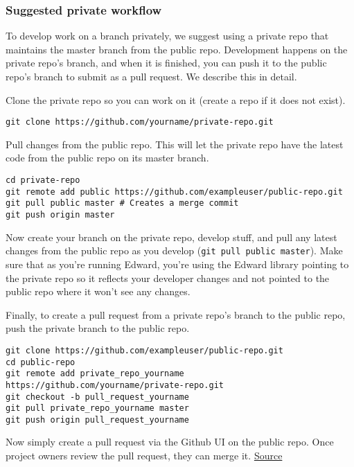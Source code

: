 \subsubsection{Suggested private
workflow}\label{suggested-private-workflow}

To develop work on a branch privately, we suggest using a private repo
that maintains the master branch from the public repo. Development
happens on the private repo's branch, and when it is finished, you can
push it to the public repo's branch to submit as a pull request. We
describe this in detail.

Clone the private repo so you can work on it (create a repo if it does
not exist).

\begin{lstlisting}[class=JSON]
git clone https://github.com/yourname/private-repo.git
\end{lstlisting}

Pull changes from the public repo. This will let the private repo have
the latest code from the public repo on its master branch.

\begin{lstlisting}[class=JSON]
cd private-repo
git remote add public https://github.com/exampleuser/public-repo.git
git pull public master # Creates a merge commit
git push origin master
\end{lstlisting}

Now create your branch on the private repo, develop stuff, and pull any
latest changes from the public repo as you develop
(\texttt{git\ pull\ public\ master}). Make sure that as you're running
Edward, you're using the Edward library pointing to the private repo so
it reflects your developer changes and not pointed to the public repo
where it won't see any changes.

Finally, to create a pull request from a private repo's branch to the
public repo, push the private branch to the public repo.

\begin{lstlisting}[class=JSON]
git clone https://github.com/exampleuser/public-repo.git
cd public-repo
git remote add private_repo_yourname https://github.com/yourname/private-repo.git
git checkout -b pull_request_yourname
git pull private_repo_yourname master
git push origin pull_request_yourname
\end{lstlisting}

Now simply create a pull request via the Github UI on the public repo.
Once project owners review the pull request, they can merge it.
\href{http://stackoverflow.com/questions/10065526/github-how-to-make-a-fork-of-public-repository-private/30352360\#30352360}{Source}
